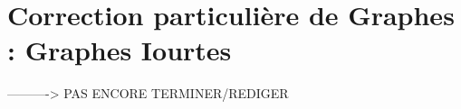\documentclass[onecolumn, 12pt]{book}
\begin{document}
	\section{Correction particuli\`ere de Graphes : Graphes Iourtes }
		    ----------> PAS ENCORE TERMINER/REDIGER

%		
%			
%			
%			
%	
%		
	
\end{document}
